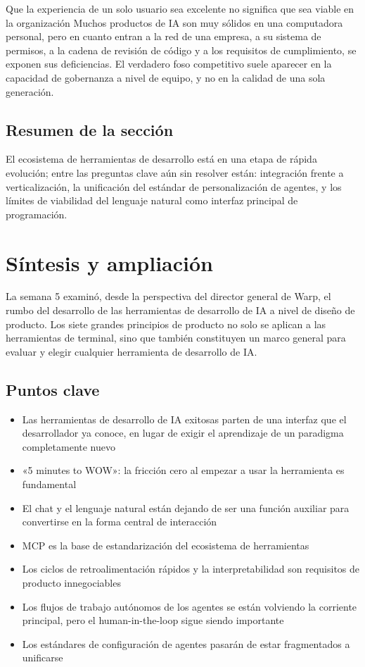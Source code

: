 \documentclass[a4paper]{article}
\begin{document}
\begin{warningbox}{Que la experiencia de un solo usuario sea excelente no significa que sea viable en la organización}
Muchos productos de IA son muy sólidos en una computadora personal, pero en cuanto entran a la red de una empresa, a su sistema de permisos, a la cadena de revisión de código y a los requisitos de cumplimiento, se exponen sus deficiencias. El verdadero foso competitivo suele aparecer en la capacidad de gobernanza a nivel de equipo, y no en la calidad de una sola generación.
\end{warningbox}

\subsection{Resumen de la sección}

El ecosistema de herramientas de desarrollo está en una etapa de rápida evolución; entre las preguntas clave aún sin resolver están: integración frente a verticalización, la unificación del estándar de personalización de agentes, y los límites de viabilidad del lenguaje natural como interfaz principal de programación.
\section{Síntesis y ampliación}

La semana 5 examinó, desde la perspectiva del director general de Warp, el rumbo del desarrollo de las herramientas de desarrollo de IA a nivel de diseño de producto. Los siete grandes principios de producto no solo se aplican a las herramientas de terminal, sino que también constituyen un marco general para evaluar y elegir cualquier herramienta de desarrollo de IA.

\subsection{Puntos clave}

\begin{itemize}
    \item Las herramientas de desarrollo de IA exitosas parten de una interfaz que el desarrollador ya conoce, en lugar de exigir el aprendizaje de un paradigma completamente nuevo
    \item «5 minutes to WOW»: la fricción cero al empezar a usar la herramienta es fundamental
    \item El chat y el lenguaje natural están dejando de ser una función auxiliar para convertirse en la forma central de interacción
    \item MCP es la base de estandarización del ecosistema de herramientas
    \item Los ciclos de retroalimentación rápidos y la interpretabilidad son requisitos de producto innegociables
    \item Los flujos de trabajo autónomos de los agentes se están volviendo la corriente principal, pero el human-in-the-loop sigue siendo importante
    \item Los estándares de configuración de agentes pasarán de estar fragmentados a unificarse
\end{itemize}
\end{document}
